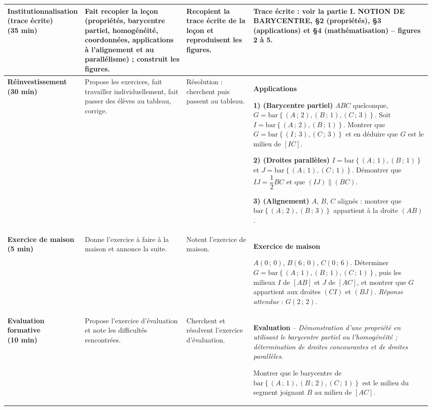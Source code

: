 \documentclass[10pt,a4paper]{article}
\newcommand{\barG}[1]{\mathrm{bar}\left\{#1\right\}}          %
\begin{document}
{\begin{longtable}{|L{3.0cm}|L{4.5cm}|L{3.5cm}|L{5.5cm}|}
\textbf{\color{cDef}Institutionnalisation\newline(trace écrite)\newline(35 min)}
& Fait recopier la leçon (propriétés, barycentre partiel, homogénéité, coordonnées, applications à l'alignement et au parallélisme) ; construit les figures.
& Recopient la trace écrite de la leçon et reproduisent les figures.
& \textbf{\color{cDef}Trace écrite} : voir la partie \textcolor{cPartie}{I. NOTION DE BARYCENTRE}, \S 2 (propriétés), \S 3 (applications) et \S 4 (mathématisation) -- figures 2 à 5.
\\\hline

\textbf{\color{cApp}Réinvestissement\newline(30 min)}
& Propose les exercices, fait travailler individuellement, fait passer des élèves au tableau, corrige.
& Résolution : cherchent puis passent au tableau.
& \textbf{\color{cApp}Applications}\par
\textbf{1) (Barycentre partiel)} $ABC$ quelconque, $G=\barG{(A\,;\,2),(B\,;\,1),(C\,;\,3)}$. Soit $I=\barG{(A\,;\,2),(B\,;\,1)}$. Montrer que $G=\barG{(I\,;\,3),(C\,;\,3)}$ et en déduire que $G$ est le milieu de $[IC]$.\par
\textbf{2) (Droites parallèles)} $I=\barG{(A\,;\,1),(B\,;\,1)}$ et $J=\barG{(A\,;\,1),(C\,;\,1)}$. Démontrer que $IJ=\dfrac{1}{2}BC$ et que $(IJ)\parallel(BC)$.\par
\textbf{3) (Alignement)} $A$, $B$, $C$ alignés : montrer que $\barG{(A\,;\,2),(B\,;\,3)}$ appartient à la droite $(AB)$.
\\\hline

\textbf{\color{cApp}Exercice de maison\newline(5 min)}
& Donne l'exercice à faire à la maison et annonce la suite.
& Notent l'exercice de maison.
& \textbf{\color{cApp}Exercice de maison}\par
$A(0\,;\,0)$, $B(6\,;\,0)$, $C(0\,;\,6)$. Déterminer $G=\barG{(A\,;\,1),(B\,;\,1),(C\,;\,1)}$, puis les milieux $I$ de $[AB]$ et $J$ de $[AC]$, et montrer que $G$ appartient aux droites $(CI)$ et $(BJ)$.\newline
\emph{Réponse attendue} : $G(2\,;\,2)$.
\\\hline

\textbf{\color{cDef}Evaluation formative\newline(10 min)}
& Propose l'exercice d'évaluation et note les difficultés rencontrées.
& Cherchent et résolvent l'exercice d'évaluation.
& \textbf{\color{cDef}Evaluation} -- \emph{Démonstration d'une propriété en utilisant le barycentre partiel ou l'homogénéité ; détermination de droites concourantes et de droites parallèles}.\par
Montrer que le barycentre de $\barG{(A\,;\,1),(B\,;\,2),(C\,;\,1)}$ est le milieu du segment joignant $B$ au milieu de $[AC]$.
\\\hline
\end{longtable}}
\end{document}

